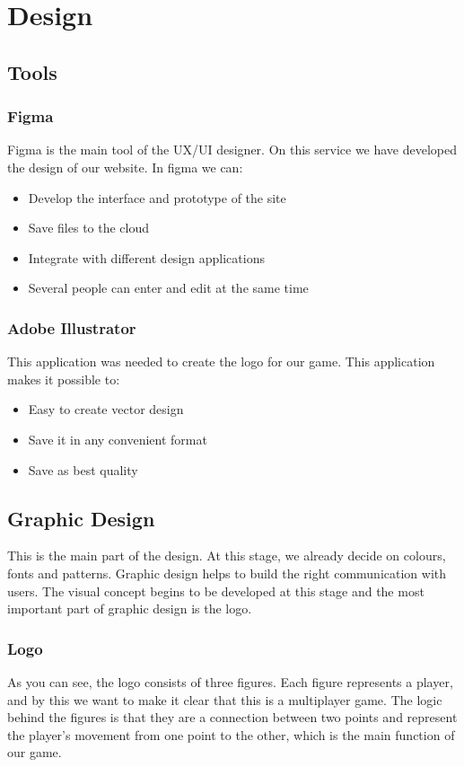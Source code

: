 \chapter{Design}\label{ch:design}
\section{Tools}
	\subsection{Figma}
	Figma is the main tool of the UX/UI designer. On this service we have developed the design of our website. In figma we can:
	\begin{itemize}
		\item Develop the interface and prototype of the site
		\item Save files to the cloud
		\item Integrate with different design applications
		\item Several people can enter and edit at the same time
	\end{itemize}
	\subsection{Adobe Illustrator}
	This application was needed to create the logo for our game. This application makes it possible to:
	\begin{itemize}
		\item Easy to create vector design
		\item Save it in any convenient format
		\item Save as best quality
	\end{itemize}
	
\section{Graphic Design}
This is the main part of the design. At this stage, we already decide on colours, fonts and patterns. Graphic design helps to build the right communication with users. The visual concept begins to be developed at this stage and the most important part of graphic design is the logo.
	\subsection{Logo}
	As you can see, the logo consists of three figures. Each figure represents a player, and by this we want to make it clear that this is a multiplayer game. The logic behind the figures is that they are a connection between two points and represent the player's movement from one point to the other, which is the main function of our game.

